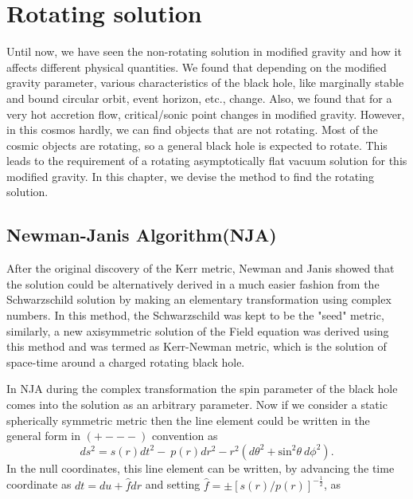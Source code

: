 \documentclass[12pt,a4paper,oneside]{book}
\newcommand{\eq}[2]{\begin{equation} \label{eq:#1} #2 \end{equation}}
\begin{document}
\chapter{Rotating solution}
Until now, we have seen the non-rotating solution in modified gravity and how it affects different physical quantities. We found that depending on the modified gravity parameter, various characteristics of the black hole, like marginally stable and bound circular orbit, event horizon, etc., change. Also, we found that for a very hot accretion flow, critical/sonic point changes in modified gravity. 
However, in this cosmos hardly, we can find objects that are not rotating. Most of the cosmic objects are rotating, so a general black hole is expected to rotate. This leads to the requirement of a rotating asymptotically flat vacuum solution for this modified gravity. In this chapter, we devise the method to find the rotating solution.

\section{Newman-Janis Algorithm(NJA)}

After the original discovery of the Kerr metric, Newman and Janis showed that the solution could be alternatively derived in a much easier fashion from the Schwarzschild solution by making an elementary transformation using complex numbers. In this method, the Schwarzschild was kept to be the "seed" metric, similarly, a new axisymmetric solution of the Field equation was derived using this method and was termed as Kerr-Newman metric, which is the solution of space-time around a charged rotating black hole.

In NJA during the complex transformation the spin parameter of the black hole comes into the solution as an arbitrary parameter. Now if we consider a static spherically symmetric metric then the line element could be written in the general form in $(+---)$ convention as \cite{Weinberg_1972} 
\eq{seed_line_element}{ds^2=s\left(r\right)dt^2-\mathrm{\ }p\left(r\right)dr^2-r^2\left(d{\theta }^2+{{\mathrm{sin}}^{\mathrm{2}} \theta \ }d{\phi }^2\right).}
\noindent In the null coordinates, this line element can be written, by 
advancing the time coordinate as $dt=du+\hat{f}dr$ and setting 
$\hat{f}=\pm {\left[s(r)/p(r)\right]}^{-\frac{1}{2}}$, as
\end{document}
